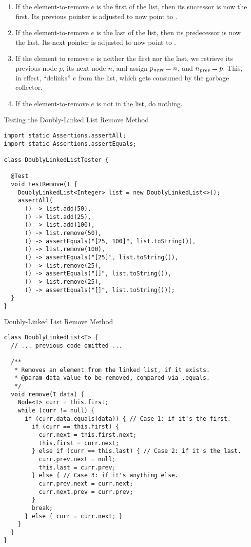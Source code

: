 \begin{enumerate}[label=(\alph*)]
  \item If the element-to-remove $e$ is the first of the list, then its successor is now the first. Its previous pointer is adjusted to now point to .
  \item If the element-to-remove $e$ is the last of the list, then its predecessor is now the last. Its next pointer is adjusted to now point to .
  \item If the element to remove $e$ is neither the first nor the last, we retrieve its previous node $p$, its next node $n$, and assign $p_\emph{next} = n$, and $n_\emph{prev} = p$. This, in effect, ``delinks'' $e$ from the list, which gets consumed by the garbage collector.
  \item If the element-to-remove $e$ is not in the list, do nothing.
\end{enumerate}

\begin{cl}[]{Testing the Doubly-Linked List Remove Method}
\begin{lstlisting}[language=MyJava]
import static Assertions.assertAll;
import static Assertions.assertEquals;

class DoublyLinkedListTester {

  @Test
  void testRemove() {
    DoublyLinkedList<Integer> list = new DoublyLinkedList<>();
    assertAll(
      () -> list.add(50),
      () -> list.add(25),
      () -> list.add(100),
      () -> list.remove(50),
      () -> assertEquals("[25, 100]", list.toString()),
      () -> list.remove(100),
      () -> assertEquals("[25]", list.toString()),
      () -> list.remove(25),
      () -> assertEquals("[]", list.toString()),
      () -> list.remove(25),
      () -> assertEquals("[]", list.toString()));
  }
}
\end{lstlisting}
\end{cl}

\begin{cl}[]{Doubly-Linked List Remove Method}
\begin{lstlisting}[language=MyJava]
class DoublyLinkedList<T> {
  // ... previous code omitted ...

  /**
   * Removes an element from the linked list, if it exists.
   * @param data value to be removed, compared via .equals.
   */
  void remove(T data) {
    Node<T> curr = this.first;
    while (curr != null) {
      if (curr.data.equals(data)) { // Case 1: if it's the first.
        if (curr == this.first) {
          curr.next = this.first.next;
          this.first = curr.next;
        } else if (curr == this.last) { // Case 2: if it's the last.
          curr.prev.next = null;
          this.last = curr.prev;
        } else { // Case 3: if it's anything else.
          curr.prev.next = curr.next;
          curr.next.prev = curr.prev;
        }
        break;
      } else { curr = curr.next; }
    }
  }
}
\end{lstlisting}
\end{cl}

